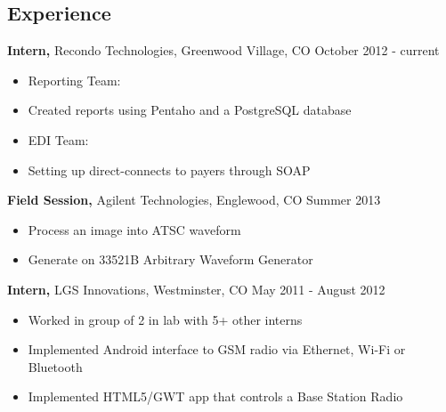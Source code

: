 \documentclass[12pt]{res}
\begin{document}

\address{{\bf Contact Information} \\ (720) 219-7914 \\ gik0geck0@gmail.com}
\address{{\bf Online Presence} \\ https://github.com/gik0geck0 \\ https://bitbucket.org/gik0geck0 }

\begin{resume}

\section{Experience}
{\bf Intern,} Recondo Technologies, Greenwood Village, CO \hfill October 2012 - current
\begin{itemize} \itemsep -2pt
    \item Reporting Team:
    \item Created reports using Pentaho and a PostgreSQL database
    \item EDI Team:
    \item Setting up direct-connects to payers through SOAP
\end{itemize}

{\bf Field Session,} Agilent Technologies, Englewood, CO \hfill Summer 2013
\begin{itemize} \itemsep -2pt
    \item Process an image into ATSC waveform
    \item Generate on 33521B Arbitrary Waveform Generator
\end{itemize}

{\bf Intern,} LGS Innovations, Westminster, CO \hfill May 2011 - August 2012
\begin{itemize} \itemsep -2pt
    \item Worked in group of 2 in lab with 5+ other interns
    \item Implemented Android interface to GSM radio via Ethernet, Wi-Fi or Bluetooth
    \item Implemented HTML5/GWT app that controls a Base Station Radio
\end{itemize}


\end{resume}
\end{document}
